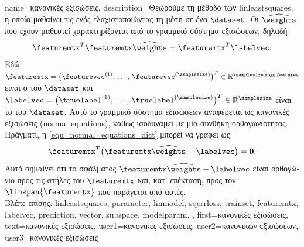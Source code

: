 {name={\foreignlanguage{greek}{κανονικές εξισώσεις}}, 
	description={\foreignlanguage{greek}{Θεωρούμε τη μέθοδο των} \gls{linleastsquares}, 
		\foreignlanguage{greek}{η οποία μαθαίνει τις}  \foreignlanguage{greek}{ενός}  
		\foreignlanguage{greek}{ελαχιστοποιώντας τη μέση}  \foreignlanguage{greek}{σε ένα}  $\dataset$. 
		\foreignlanguage{greek}{Οι}  $\widehat{\weights}$ \foreignlanguage{greek}{που έχουν μαθευτεί χαρακτηρίζονται 
		από το γραμμικό σύστημα εξισώσεων, δηλαδή}
		\begin{equation} 
			\label{equ_normal_equations_dict}
			\featuremtx^{T} \featuremtx \widehat{\weights} = \featuremtx^{T} \labelvec.
		\end{equation}  
		\foreignlanguage{greek}{Εδώ $\featuremtx=\big(\featurevec^{(1)},\,\ldots,\,\featurevec^{(\samplesize)}\big)^{T} \in \mathbb{R}^{\samplesize \times \nrfeatures}$ 
		είναι ο}  \foreignlanguage{greek}{του $\dataset$ και $\labelvec=\big(\truelabel^{(1)},\,\ldots,\,\truelabel^{(\samplesize)} \big)^{T} \in \mathbb{R}^{\samplesize}$ 
		είναι το}  \foreignlanguage{greek}{του $\dataset$. Αυτό το γραμμικό σύστημα εξισώσεων αναφέρεται ως κανονικές 
		εξισώσεις} (normal equations), \foreignlanguage{greek}{καθώς ισοδυναμεί με μία συνθήκη ορθογωνιότητας. Πράγματι, η}  
		\eqref{equ_normal_equations_dict} \foreignlanguage{greek}{μπορεί να γραφεί ως}
		$$ \featuremtx^{T} \big( \featuremtx \widehat{\weights} - \labelvec \big) = \mathbf{0}.$$
		\foreignlanguage{greek}{Αυτό σημαίνει ότι το}  \foreignlanguage{greek}{σφάλματος}  
		$\featuremtx \widehat{\weights} - \labelvec$ \foreignlanguage{greek}{είναι ορθογώνιο προς τις στήλες του $\featuremtx$ και, κατ' επέκταση, 
		προς τον}  $\linspan{\featuremtx}$ \foreignlanguage{greek}{που παράγεται από αυτές}.
		\\ 
		\foreignlanguage{greek}{Βλέπε επίσης:} \gls{linleastsquares}, \gls{parameter}, \gls{linmodel}, \gls{sqerrloss}, \gls{trainset}, \gls{featuremtx}, 
		\gls{labelvec}, \gls{prediction}, \gls{vector}, \gls{subspace}, \gls{modelparam}. },
	first={\foreignlanguage{greek}{κανονικές εξισώσεις}},
	text={\foreignlanguage{greek}{κανονικές εξισώσεις}},
	user1={\foreignlanguage{greek}{κανονικές εξισώσεις}}, %
	user2={\foreignlanguage{greek}{κανονικών εξισώσεων}}, %
	user3={\foreignlanguage{greek}{κανονικές εξισώσεις}} %
}

